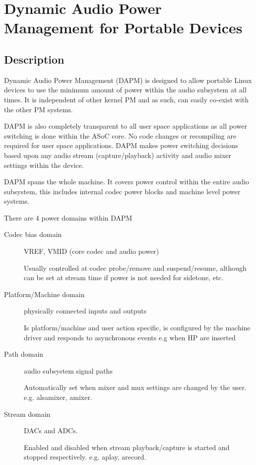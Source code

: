 \documentclass[a4paper,8pt,english]{sphinxmanual}
\begin{document}
\section{Dynamic Audio Power Management for Portable Devices}
\label{sound/soc/dapm:dynamic-audio-power-management-for-portable-devices}\label{sound/soc/dapm::doc}

\subsection{Description}
\label{sound/soc/dapm:description}
Dynamic Audio Power Management (DAPM) is designed to allow portable
Linux devices to use the minimum amount of power within the audio
subsystem at all times. It is independent of other kernel PM and as
such, can easily co-exist with the other PM systems.

DAPM is also completely transparent to all user space applications as
all power switching is done within the ASoC core. No code changes or
recompiling are required for user space applications. DAPM makes power
switching decisions based upon any audio stream (capture/playback)
activity and audio mixer settings within the device.

DAPM spans the whole machine. It covers power control within the entire
audio subsystem, this includes internal codec power blocks and machine
level power systems.

There are 4 power domains within DAPM
\begin{description}
\item[{Codec bias domain}] \leavevmode
VREF, VMID (core codec and audio power)

Usually controlled at codec probe/remove and suspend/resume, although
can be set at stream time if power is not needed for sidetone, etc.

\item[{Platform/Machine domain}] \leavevmode
physically connected inputs and outputs

Is platform/machine and user action specific, is configured by the
machine driver and responds to asynchronous events e.g when HP
are inserted

\item[{Path domain}] \leavevmode
audio subsystem signal paths

Automatically set when mixer and mux settings are changed by the user.
e.g. alsamixer, amixer.

\item[{Stream domain}] \leavevmode
DACs and ADCs.

Enabled and disabled when stream playback/capture is started and
stopped respectively. e.g. aplay, arecord.

\end{description}
\end{document}

